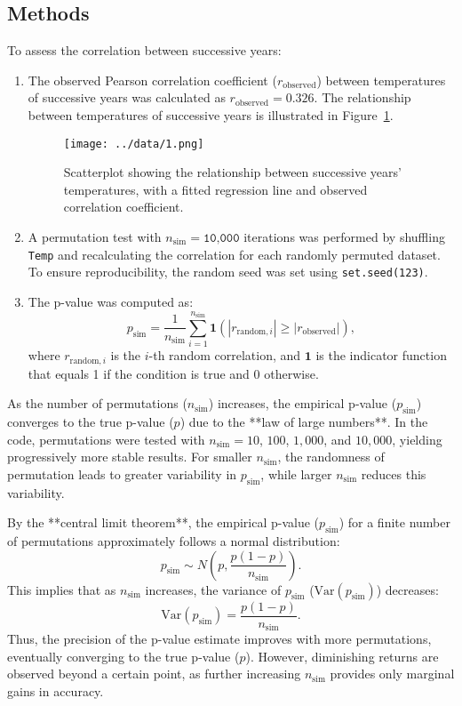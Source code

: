 \documentclass[a4paper,10pt]{article}
\begin{document}
\subsection*{Methods}
To assess the correlation between successive years:
\begin{enumerate}
    \item The observed Pearson correlation coefficient (\(r_{\text{observed}}\)) between temperatures of successive years was calculated as \(r_{\text{observed}} = 0.326\). The relationship between temperatures of successive years is illustrated in Figure~\ref{fig:scatterplot}.
    
   \begin{figure}[h!]
\centering
\texttt{[image: ../data/1.png]}
\caption{Scatterplot showing the relationship between successive years' temperatures, with a fitted regression line and observed correlation coefficient.}
\label{fig:scatterplot}
\end{figure}
    
    \item A permutation test with \(n_{\text{sim}} = \texttt{10,000}\) iterations was performed by shuffling \texttt{Temp} and recalculating the correlation for each randomly permuted dataset. To ensure reproducibility, the random seed was set using \texttt{set.seed(123)}.
    \item The p-value was computed as:
    \[
    p_{\text{sim}} = \frac{1}{n_{\text{sim}}} \sum_{i=1}^{n_{\text{sim}}} \mathbf{1}\left(|r_{\text{random}, i}| \geq |r_{\text{observed}}|\right),
    \]
    where \(r_{\text{random}, i}\) is the \(i\)-th random correlation, and \(\mathbf{1}\) is the indicator function that equals 1 if the condition is true and 0 otherwise.
\end{enumerate}


As the number of permutations (\(n_{\text{sim}}\)) increases, the empirical p-value (\(p_{\text{sim}}\)) converges to the true p-value (\(p\)) due to the **law of large numbers**. In the code, permutations were tested with \(n_{\text{sim}} = 10\), \(100\), \(1,000\), and \(10,000\), yielding progressively more stable results. For smaller \(n_{\text{sim}}\), the randomness of permutation leads to greater variability in \(p_{\text{sim}}\), while larger \(n_{\text{sim}}\) reduces this variability.

By the **central limit theorem**, the empirical p-value (\(p_{\text{sim}}\)) for a finite number of permutations approximately follows a normal distribution:
\[
p_{\text{sim}} \sim N\left(p, \frac{p(1-p)}{n_{\text{sim}}}\right).
\]
This implies that as \(n_{\text{sim}}\) increases, the variance of \(p_{\text{sim}}\) (\(\text{Var}(p_{\text{sim}})\)) decreases:
\[
\text{Var}(p_{\text{sim}}) = \frac{p(1-p)}{n_{\text{sim}}}.
\]
Thus, the precision of the p-value estimate improves with more permutations, eventually converging to the true p-value (\(p\)). However, diminishing returns are observed beyond a certain point, as further increasing \(n_{\text{sim}}\) provides only marginal gains in accuracy.
\end{document}
